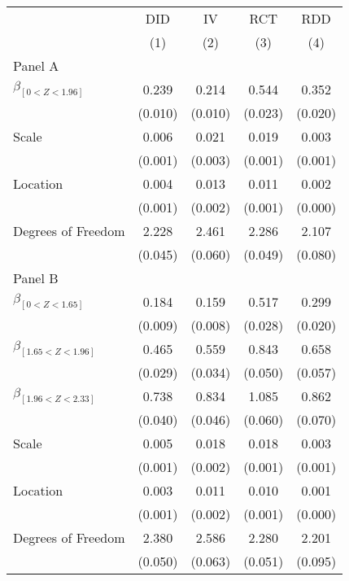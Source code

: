 \def\sym#1{\ifmmode^{#1}\else\(^{#1}\)\fi}
\begin{tabular}{l*{4}{c}}
\hline\hline
& \multicolumn{1}{c}{DID} &  \multicolumn{1}{c}{IV} &  \multicolumn{1}{c}{RCT} &  \multicolumn{1}{c}{RDD}\\

& \multicolumn{1}{c}{(1)} &  \multicolumn{1}{c}{(2)} &  \multicolumn{1}{c}{(3)} &  \multicolumn{1}{c}{(4)}\\

\hline
\hline

Panel A \\

$\beta_{[0 < Z < 1.96]}$ & 0.239 &  0.214 &  0.544 &  0.352\\
& (0.010) &  (0.010) &  (0.023) &  (0.020)\\

Scale & 0.006 &  0.021 &  0.019 &  0.003\\
& (0.001) &  (0.003) &  (0.001) &  (0.001)
\\

Location & 0.004 &  0.013 &  0.011 &  0.002\\
& (0.001) &  (0.002) &  (0.001) &  (0.000)
\\

Degrees of Freedom & 2.228 &  2.461 &  2.286 &  2.107\\
& (0.045) &  (0.060) &  (0.049) &  (0.080)\\
Panel B \\

$\beta_{[0 < Z < 1.65]}$ & 0.184 &  0.159 &  0.517 &  0.299\\
& (0.009) &  (0.008) &  (0.028) &  (0.020)\\

$\beta_{[1.65 < Z < 1.96]}$ & 0.465 &  0.559 &  0.843 &  0.658\\
& (0.029) &  (0.034) &  (0.050) &  (0.057)\\


$\beta_{[1.96 < Z < 2.33]}$ & 0.738 &  0.834 &  1.085 &  0.862\\
& (0.040) &  (0.046) &  (0.060) &  (0.070)\\

Scale & 0.005 &  0.018 &  0.018 &  0.003\\
& (0.001) &  (0.002) &  (0.001) &  (0.001)
\\

Location & 0.003 &  0.011 &  0.010 &  0.001\\
& (0.001) &  (0.002) &  (0.001) &  (0.000)
\\

Degrees of Freedom & 2.380 &  2.586 &  2.280 &  2.201\\
& (0.050) &  (0.063) &  (0.051) &  (0.095)\\

\hline\hline
\end{tabular}

